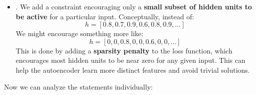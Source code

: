 \begin{itemize}
    \item {}. We add a constraint encouraging only a \textbf{small subset of hidden units to be active} for a particular input. Conceptually, instead of:
        \begin{equation*}
            h = \left[
                0.8, 0.7, 0.9, 0.6, 0.8, 0.9, \dots
            \right]
        \end{equation*}
        We might encourage something more like:
        \begin{equation*}
            h = \left[
                0, 0, 0.8, 0, 0, 0.6, 0, 0, \dots
            \right]
        \end{equation*}
        This is done by adding a \textbf{sparsity penalty} to the loss function, which encourages most hidden units to be near zero for any given input. This can help the autoencoder learn more distinct features and avoid trivial solutions.
\end{itemize}
Now we can analyze the statements individually:
